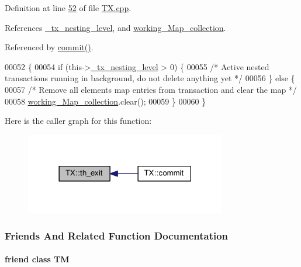 Definition at line \hyperlink{_t_x_8cpp_source_l00052}{52} of file \hyperlink{_t_x_8cpp_source}{T\+X.\+cpp}.



References \hyperlink{_t_x_8h_source_l00101}{\+\_\+tx\+\_\+nesting\+\_\+level}, and \hyperlink{_t_x_8h_source_l00093}{working\+\_\+\+Map\+\_\+collection}.



Referenced by \hyperlink{_t_x_8cpp_source_l00177}{commit()}.


\begin{DoxyCode}
00052                  \{
00054     \textcolor{keywordflow}{if} (this->\hyperlink{class_t_x_ae8f413fd7f4fea322e7ad3c668f9898e_ae8f413fd7f4fea322e7ad3c668f9898e}{\_tx\_nesting\_level} > 0) \{
00055         \textcolor{comment}{/* Active nested transactions running in background, do not delete anything yet */}
00056     \} \textcolor{keywordflow}{else} \{
00057         \textcolor{comment}{/* Remove all elements map entries from transaction and clear the map */}
00058         \hyperlink{class_t_x_a81aafda16e2f20e36ec6c68e584668ff_a81aafda16e2f20e36ec6c68e584668ff}{working\_Map\_collection}.clear();
00059     \}
00060 \}
\end{DoxyCode}


Here is the caller graph for this function\+:
\nopagebreak
\begin{figure}[H]
\begin{center}
\leavevmode
\includegraphics[width=249pt]{class_t_x_ae045534c4a9d39bd5c6ea2a39a372a79_ae045534c4a9d39bd5c6ea2a39a372a79_icgraph}
\end{center}
\end{figure}




\subsubsection{Friends And Related Function Documentation}
\paragraph[{\texorpdfstring{TM}{TM}}]{\setlength{\rightskip}{0pt plus 5cm}friend class {\bf TM}\hspace{0.3cm}{\ttfamily [friend]}}\hypertarget{class_t_x_adf1ccda799ef5c419cb43b8ae55eb45c_adf1ccda799ef5c419cb43b8ae55eb45c}{}\label{class_t_x_adf1ccda799ef5c419cb43b8ae55eb45c_adf1ccda799ef5c419cb43b8ae55eb45c}



